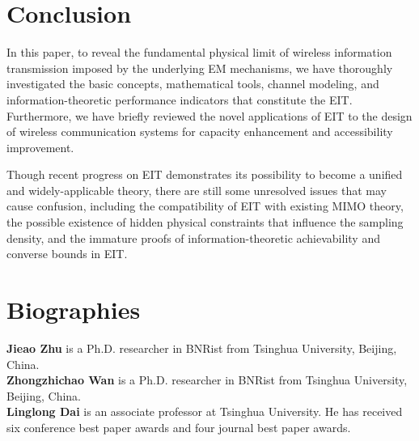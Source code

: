 \documentclass[journal,twocolumn]{IEEEtran}
\begin{document}
\section{Conclusion}
In this paper, to reveal the fundamental physical limit of wireless information transmission imposed by the underlying EM mechanisms, we have thoroughly investigated the basic concepts, mathematical tools, channel modeling, and information-theoretic performance indicators that constitute the EIT. 
Furthermore, we have briefly reviewed the novel applications of EIT to the design of wireless communication systems for capacity enhancement and accessibility improvement. 

Though recent progress on EIT demonstrates its possibility to become a unified and widely-applicable theory, there are still some unresolved issues that may cause confusion, including the compatibility of EIT with existing MIMO theory, the possible existence of hidden physical constraints that influence the sampling density, and the immature proofs of information-theoretic achievability and converse bounds in EIT. 

\footnotesize




\normalsize
\section*{Biographies}

{\bf Jieao Zhu} is a Ph.D. researcher in BNRist from Tsinghua University, Beijing, China.
\\

{\bf Zhongzhichao Wan} is a Ph.D. researcher in BNRist from Tsinghua University, Beijing, China.
\\


{\bf Linglong Dai} is an associate professor at Tsinghua University. He has received six conference best paper awards and four journal best paper awards. 
\end{document}
